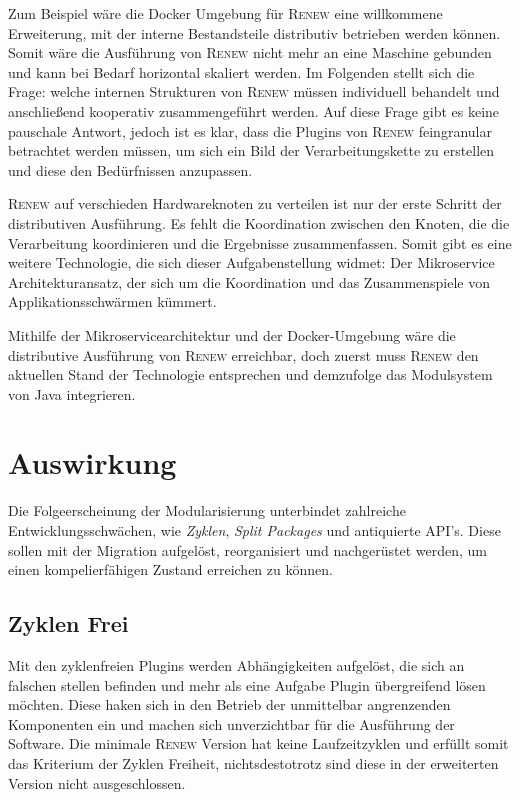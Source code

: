 		Zum Beispiel wäre die Docker Umgebung für \textsc{Renew} eine willkommene Erweiterung, mit der interne Bestandsteile distributiv betrieben werden können. Somit wäre die Ausführung von \textsc{Renew} nicht mehr an eine Maschine gebunden und kann bei Bedarf horizontal skaliert werden. Im Folgenden stellt sich die Frage: welche internen Strukturen von \textsc{Renew} müssen individuell behandelt und anschließend kooperativ zusammengeführt werden. Auf diese Frage gibt es keine pauschale Antwort, jedoch ist es klar, dass die Plugins von \textsc{Renew} feingranular betrachtet werden müssen, um sich ein Bild der Verarbeitungskette zu erstellen und diese den Bedürfnissen anzupassen. \bigbreak

		\textsc{Renew} auf verschieden Hardwareknoten zu verteilen ist nur der erste Schritt der distributiven Ausführung. Es fehlt die Koordination zwischen den Knoten, die die Verarbeitung koordinieren und die Ergebnisse zusammenfassen. Somit gibt es eine weitere Technologie, die sich dieser Aufgabenstellung widmet: Der Mikroservice Architekturansatz, der sich um die Koordination und das Zusammenspiele von Applikationsschwärmen kümmert. \bigbreak

		Mithilfe der Mikroservicearchitektur und der Docker-Umgebung wäre die distributive Ausführung von \textsc{Renew} erreichbar, doch zuerst muss \textsc{Renew} den aktuellen Stand der Technologie entsprechen und demzufolge das Modulsystem von Java integrieren.  

\section{Auswirkung} \label{sec:auswirkung}
	Die Folgeerscheinung der Modularisierung unterbindet zahlreiche Entwicklungsschwächen, wie \textit{Zyklen}, \textit{Split Packages} und antiquierte API's. Diese sollen mit der Migration aufgelöst, reorganisiert und nachgerüstet werden, um einen kompelierfähigen Zustand erreichen zu können.

	\subsection{Zyklen Frei} 
		Mit den zyklenfreien Plugins werden Abhängigkeiten aufgelöst, die sich an falschen stellen befinden und mehr als eine Aufgabe Plugin übergreifend lösen möchten. Diese haken sich in den Betrieb der unmittelbar angrenzenden Komponenten ein und machen sich unverzichtbar für die Ausführung der Software. Die minimale \textsc{Renew} Version hat keine Laufzeitzyklen und erfüllt somit das Kriterium der Zyklen Freiheit, nichtsdestotrotz sind diese in der erweiterten Version nicht ausgeschlossen.


